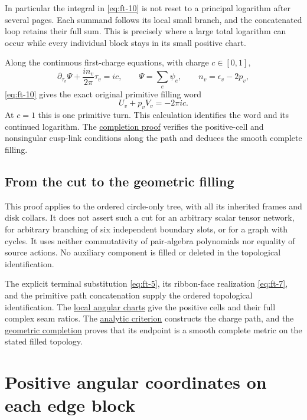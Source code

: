 In particular the integral in \eqref{eq:ft-10} is not reset to a principal logarithm after several pages. Each summand follows its local small branch, and the concatenated loop retains their full sum. This is precisely where a large total logarithm can occur while every individual block stays in its small positive chart.

Along the continuous first-charge equations, with charge \(c\in[0,1]\),
\begin{equation}
\partial_{\tau_v}\Psi
       +\frac{i n_v}{2\pi}\tau_v=ic,
 \qquad \Psi=\sum_e\psi_e,
 \qquad n_v=\epsilon_v-2p_v,
\label{eq:ft-11}
\end{equation}
\eqref{eq:ft-10} gives the exact original primitive filling word
\begin{equation}
U_v+p_vV_v=-2\pi i c.
\label{eq:ft-12}
\end{equation}
At \(c=1\) this is one primitive turn. This calculation identifies the word and its continued logarithm. The \hyperref[sec:fg]{completion proof} verifies the positive-cell and nonsingular cusp-link conditions along the path and deduces the smooth complete filling.

\subsection{From the cut to the geometric filling}\label{sec:ft-7}

This proof applies to the ordered circle-only tree, with all its inherited frames and disk collars. It does not assert such a cut for an arbitrary scalar tensor network, for arbitrary branching of six independent boundary slots, or for a graph with cycles. It uses neither commutativity of pair-algebra polynomials nor equality of source actions. No auxiliary component is filled or deleted in the topological identification.

The explicit terminal substitution \eqref{eq:ft-5}, its ribbon-face realization \eqref{eq:ft-7}, and the primitive path concatenation supply the ordered topological identification. The \hyperref[sec:fa]{local angular charts} give the positive cells and their full complex seam ratios. The \hyperref[sec:qe]{analytic criterion} constructs the charge path, and the \hyperref[sec:fg]{geometric completion} proves that its endpoint is a smooth complete metric on the stated filled topology.

\section{Positive angular coordinates on each edge block}\label{sec:fa}

